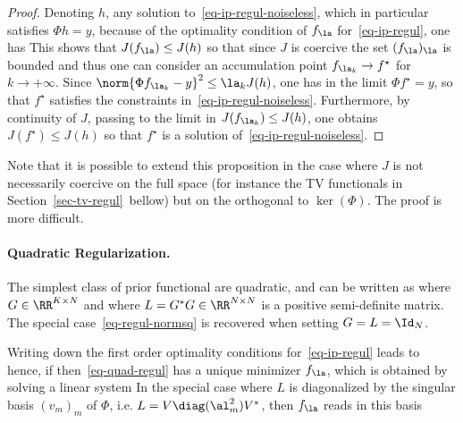 \begin{proof}
	Denoting $h$, any solution to~\eqref{eq-ip-regul-noiseless}, which in particular satisfies $\Phi h = y$, because of the optimality condition of $f_\la$ for~\eqref{eq-ip-regul}, one has
	This shows that $J(f_\la) \leq J(h)$ so that since $J$ is coercive the set $(f_\la)_\la$ is bounded and thus one can consider an accumulation point $f_{\la_k} \rightarrow f^\star$ for $k \rightarrow +\infty$.  Since $\norm{\Phi f_{\la_k}-y}^2 \leq \la_k J(h)$, one has in the limit $\Phi f^\star = y$, so that $f^\star$ satisfies the constraints in~\eqref{eq-ip-regul-noiseless}. Furthermore, by continuity of $J$, passing to the limit in $J(f_{\la_k}) \leq J(h)$, one obtains $J(f^\star) \leq J(h)$ so that $f^\star$ is a solution of~\eqref{eq-ip-regul-noiseless}. 
\end{proof}

Note that it is possible to extend this proposition in the case where $J$ is not necessarily coercive on the full space (for instance the TV functionals in Section~\ref{sec-tv-regul} bellow) but on the orthogonal to $\ker(\Phi)$. The proof is more difficult.


\paragraph{Quadratic Regularization.}

The simplest class of prior functional are quadratic, and can be written as
where $G \in \RR^{K \times N}$ and 
where $L=G^*G \in \RR^{N \times N}$ is a positive semi-definite matrix.
%
The special case~\eqref{eq-regul-normsq} is recovered when setting $G=L=\Id_N$. 

Writing down the first order optimality conditions for~\eqref{eq-ip-regul} leads to
hence, if
then~\eqref{eq-quad-regul} has a unique minimizer $f_\la$, which is obtained by solving a linear system
In the special case where $L$ is diagonalized by the singular basis $(v_m)_m$ of $\Phi$, i.e. $L=V \diag(\al_m^2) V^*$, then $f_\la$ reads in this basis 


